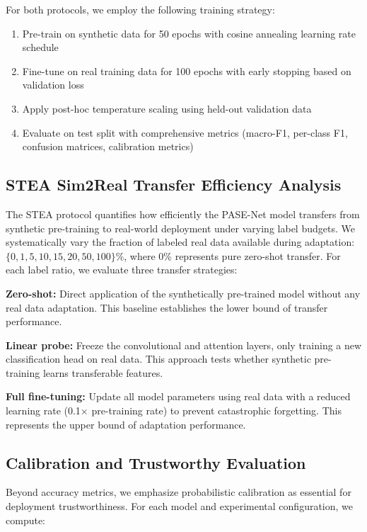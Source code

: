 \documentclass[lettersize,journal]{IEEEtran}
\begin{document}
For both protocols, we employ the following training strategy:
\begin{enumerate}
\item Pre-train on synthetic data for 50 epochs with cosine annealing learning rate schedule
\item Fine-tune on real training data for 100 epochs with early stopping based on validation loss
\item Apply post-hoc temperature scaling using held-out validation data
\item Evaluate on test split with comprehensive metrics (macro-F1, per-class F1, confusion matrices, calibration metrics)
\end{enumerate}

\subsection{STEA Sim2Real Transfer Efficiency Analysis}

The STEA protocol quantifies how efficiently the PASE-Net model transfers from synthetic pre-training to real-world deployment under varying label budgets. We systematically vary the fraction of labeled real data available during adaptation: $\{0, 1, 5, 10, 15, 20, 50, 100\}\%$, where 0\% represents pure zero-shot transfer. For each label ratio, we evaluate three transfer strategies:

\textbf{Zero-shot:} Direct application of the synthetically pre-trained model without any real data adaptation. This baseline establishes the lower bound of transfer performance.

\textbf{Linear probe:} Freeze the convolutional and attention layers, only training a new classification head on real data. This approach tests whether synthetic pre-training learns transferable features.

\textbf{Full fine-tuning:} Update all model parameters using real data with a reduced learning rate (0.1× pre-training rate) to prevent catastrophic forgetting. This represents the upper bound of adaptation performance.

\subsection{Calibration and Trustworthy Evaluation}

Beyond accuracy metrics, we emphasize probabilistic calibration as essential for deployment trustworthiness. For each model and experimental configuration, we compute:
\end{document}
